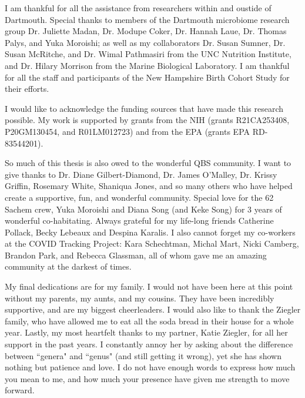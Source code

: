 \documentclass{dcthesis}
\theoremstyle{definition}
\theoremstyle{remark}
\begin{document}
I am thankful for all the assistance from researchers within and oustide of Dartmouth. Special thanks to members of the Dartmouth microbiome research group Dr. Juliette Madan, Dr. Modupe Coker, Dr. Hannah Laue, Dr. Thomas Palys, and Yuka Moroishi; as well as my collaborators Dr. Susan Sumner, Dr. Susan McRitche, and Dr. Wimal Pathmasiri from the UNC Nutrition Institute, and Dr. Hilary Morrison from the Marine Biological Laboratory. I am thankful for all the staff and participants of the New Hampshire Birth Cohort Study for their efforts.  

I would like to acknowledge the funding sources that have made this research possible. My work is supported by grants from the NIH (grants R21CA253408, P20GM130454, and R01LM012723) and from the EPA (grants EPA RD-83544201).  

So much of this thesis is also owed to the wonderful QBS community. I want to give thanks to Dr. Diane Gilbert-Diamond, Dr. James O'Malley, Dr. Krissy Griffin, Rosemary White, Shaniqua Jones, and so many others who have helped create a supportive, fun, and wonderful community. Special love for the 62 Sachem crew, Yuka Moroishi and Diana Song (and Keke Song) for 3 years of wonderful co-habitating. Always grateful for my life-long friends Catherine Pollack, Becky Lebeaux and Despina Karalis. I also cannot forget my co-workers at the COVID Tracking Project: Kara Schechtman, Michal Mart, Nicki Camberg, Brandon Park, and Rebecca Glassman, all of whom gave me an amazing community at the darkest of times.  

My final dedications are for my family. I would not have been here at this point without my parents, my aunts, and my cousins. They have been incredibly supportive, and are my biggest cheerleaders. I would also like to thank the Ziegler family, who have allowed me to eat all the soda bread in their house for a whole year. Lastly, my most heartfelt thanks to my partner, Katie Ziegler, for all her support in the past years. I constantly annoy her by asking about the difference between ``genera" and ``genus" (and still getting it wrong), yet she has shown nothing but patience and love. I do not have enough words to express how much you mean to me, and how much your presence have given me strength to move forward.  









\tableofcontents
\end{document}
